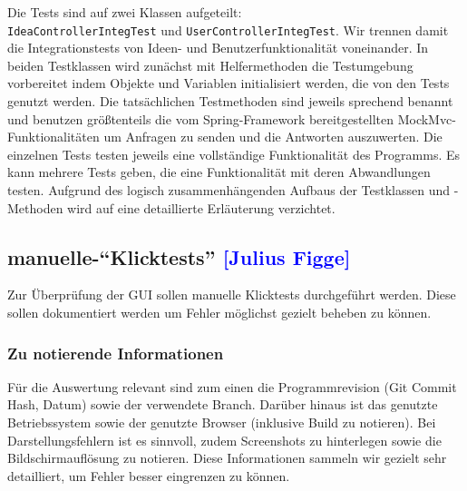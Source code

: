 Die Tests sind auf zwei Klassen aufgeteilt: \\
\texttt{IdeaControllerIntegTest} und \texttt{UserControllerIntegTest}. Wir trennen damit die Integrationstests von Ideen- und Benutzerfunktionalität voneinander. In beiden Testklassen wird zunächst mit Helfermethoden die Testumgebung vorbereitet indem Objekte und Variablen initialisiert werden, die von den Tests genutzt werden.
Die tatsächlichen Testmethoden sind jeweils sprechend benannt und benutzen größtenteils die vom Spring-Framework bereitgestellten MockMvc-Funktionalitäten um Anfragen zu senden und die Antworten auszuwerten. Die einzelnen Tests testen jeweils eine vollständige Funktionalität des Programms. Es kann mehrere Tests geben, die eine Funktionalität mit deren Abwandlungen testen.
Aufgrund des logisch zusammenhängenden Aufbaus der Testklassen und -Methoden wird auf eine detaillierte Erläuterung verzichtet.

\subsection{manuelle-\enquote{Klicktests} \textcolor{blue}{[Julius Figge]}}

Zur Überprüfung der GUI sollen manuelle Klicktests durchgeführt werden.
Diese sollen dokumentiert werden um Fehler möglichst gezielt beheben zu können.

\subsubsection*{Zu notierende Informationen}
Für die Auswertung relevant sind zum einen die Programmrevision (Git Commit Hash, Datum) sowie der verwendete Branch. Darüber hinaus ist das genutzte Betriebssystem sowie der genutzte Browser (inklusive Build zu notieren).
Bei Darstellungsfehlern ist es sinnvoll, zudem Screenshots zu hinterlegen sowie die Bildschirmauflösung zu notieren.
Diese Informationen sammeln wir gezielt sehr detailliert, um Fehler besser eingrenzen zu können.

